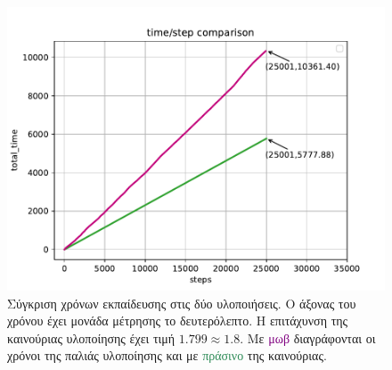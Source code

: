 \begin{figure}
    \centering
    \includegraphics[width=\textwidth]{figures/experiments/kitti_compare.pdf}
    \caption[Σύγκριση χρόνων εκπαίδευσης στις δύο υλοποιήσεις]{Σύγκριση χρόνων εκπαίδευσης στις δύο υλοποιήσεις. Ο άξονας του χρόνου έχει μονάδα μέτρησης το δευτερόλεπτο. Η επιτάχυνση της καινούριας υλοποίησης έχει τιμή $1.799 \approx 1.8$. Με \textcolor{purple}{μωβ} διαγράφονται οι χρόνοι της παλιάς υλοποίησης και με \textcolor{SeaGreen}{πράσινο} της καινούριας.}
    \label{fig:kittiCompare}
\end{figure}


